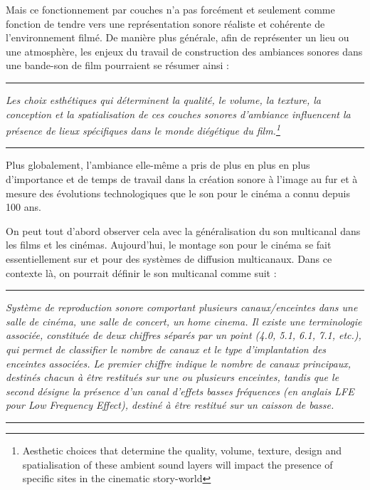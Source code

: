 ﻿\documentclass[12pt]{article}
\newcommand{\citationpropre}[3]{
\vspace{1.7em}
\hrule
\vspace{0.8em}

\textit{#1}

\hfill \parencite[#2]{#3}

\vspace{0.6em}
\hrule
\vspace{1.7em}
}
\begin{document}
Mais ce fonctionnement par couches n'a pas forcément et seulement comme fonction de tendre vers une représentation sonore réaliste et cohérente de l'environnement filmé. De manière plus générale, afin de représenter un lieu ou une atmosphère, les enjeux du travail de construction des ambiances sonores dans une bande-son de film pourraient se résumer ainsi : 

\citationpropre{Les choix esthétiques qui déterminent la qualité, le volume, la texture, la conception et la spatialisation de ces couches sonores d'ambiance influencent la présence de lieux spécifiques dans le monde diégétique du film.\footnote{Aesthetic choices that determine the quality, volume, texture, design and spatialisation of these ambient sound layers will impact the presence of specific sites in the cinematic story-world} }{p.~36}{chattopadhyay_auditory_2021}

\leavevmode

Plus globalement,  l'ambiance elle-même a pris de plus en plus en plus d'importance et de temps de travail dans la création sonore à l'image au fur et à mesure des évolutions technologiques que le son pour le cinéma a connu depuis 100 ans.

On peut tout d'abord observer cela avec la généralisation du son multicanal dans les films et les cinémas. Aujourd'hui, le montage son pour le cinéma se fait essentiellement sur et pour des systèmes de diffusion multicanaux. Dans ce contexte là, on pourrait définir le son multicanal comme suit :

\citationpropre{Système de reproduction sonore comportant plusieurs canaux/enceintes dans une salle de cinéma, une salle de concert, un home cinema. Il existe une terminologie associée, constituée de deux chiffres séparés par un point (4.0, 5.1, 6.1, 7.1, etc.), qui permet de classifier le nombre de canaux et le type d’implantation des enceintes associées. Le premier chiffre indique le nombre de canaux principaux, destinés chacun à être restitués sur une ou plusieurs enceintes, tandis que le second désigne la présence d’un canal d’effets basses fréquences (en anglais LFE pour Low Frequency Effect), destiné à être restitué sur un caisson de basse.}{p.~489}{de_nanteuil_dictionnaire_2008}
\end{document}
